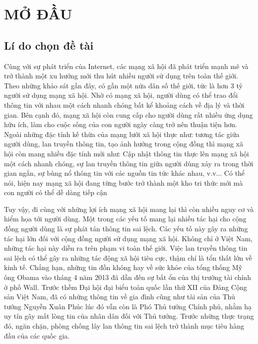 \chapter* {MỞ ĐẦU}

\tocless\section {Lí do chọn đề tài}
Cùng với sự phát triển của Internet, các mạng xã hội đã phát triển mạnh mẽ và trở thành một xu hướng mới thu hút nhiều người sử dụng trên toàn thế giới. Theo những khảo sát gần đây, có gần một nửa dân số thế giới, tức là hơn 3 tỷ người sử dụng mạng xã hội. Nhờ có mạng xã hội, người dùng có thể trao đổi thông tin với nhau một cách nhanh chóng bất kể khoảng cách về địa lý và thời gian. Bên cạnh đó, mạng xã hội còn cung cấp cho người dùng rất nhiều ứng dụng hữu ích, làm cho cuộc sống của con người ngày càng trở nên thuận tiện hơn. Ngoài những đặc tính kế thừa của mạng lưới xã hội thực như: tương tác giữa người dùng, lan truyền thông tin, tạo ảnh hưởng trong cộng đồng thì mạng xã hội còn mang nhiều đặc tính mới như: Cập nhật thông tin thực lên mạng xã hội một cách nhanh chóng, sự lan truyền thông tin giữa người dùng xảy ra trong thời gian ngắn, sự bùng nổ thông tin với các nguồn tin tức khác nhau, v.v... Có thể nói, hiện nay mạng xã hội đang từng bước trở thành một kho tri thức mới mà con người có thể dễ dàng tiếp cận 

Tuy vậy, đi cùng với những lợi ích mạng xã hội mang lại thì còn nhiều nguy cơ và hiểm họa tới người dùng. Một trong các yếu tố mang lại nhiều tác hại cho cộng đồng người dùng là sự phát tán thông tin sai lệch. Các yếu tố này gây ra những tác hại lớn đối với cộng đồng người sử dụng mạng xã hội. Không chỉ ở Việt Nam, những tác hại này diễn ra trên phạm vi toàn thế giới. Việc lan truyền thông tin sai lệch có thể gây ra những tác động xã hội tiêu cực, thậm chí là tổn thất lớn về kinh tế. Chẳng hạn, những tin đồn không hay về sức khỏe của tổng thống Mỹ ông Obama vào tháng 4 năm 2013 đã dẫn đến sự bất ổn của thị trường tài chính ở phố Wall. Trước thềm Đại hội đại biểu toàn quốc lần thứ XII của Đảng Cộng sản Việt Nam, đã có những thông tin về gia đình cũng như tài sản của Thủ tướng Nguyễn Xuân Phúc lúc đó vẫn còn là Phó Thủ tướng Chính phủ, nhằm hạ uy tín gây mất lòng tin của nhân dân đối với Thủ tướng. Trước những thực trạng đó, ngăn chặn, phòng chống lây lan thông tin sai lệch trở thành mục tiêu hàng đầu của các quốc gia.

